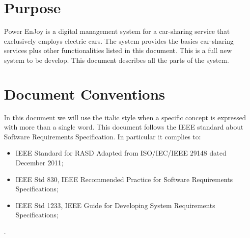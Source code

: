 \documentclass{scrreprt}
\begin{document}
\section{Purpose}
Power EnJoy is a digital management system for a car-sharing service that exclusively employs electric cars.
The system provides the basics car-sharing services plus other functionalities listed in this document.
This is a full new system to be develop. This document describes all the parts of the system. 
\begin{comment}$<$Identify the product whose software requirements are specified in this 
document, including the revision or release number. Describe the scope of the 
product that is covered by this SRS, particularly if this SRS describes only 
part of the system or a single subsystem.$>$
\end{comment}

\section{Document Conventions}
In this document we will use the italic style when a specific concept is expressed with more than a single word.
This document follows the IEEE standard about Software Requirements Specification. In particular it complies to:
\begin{itemize}
\item IEEE Standard for RASD Adapted from ISO/IEC/IEEE 29148 dated December 2011;
\item IEEE Std 830, IEEE Recommended Practice for Software Requirements Specifications;
\item IEEE Std 1233, IEEE Guide for Developing System Requirements Specifications;
\end{itemize}.
\begin{comment}$<$Describe any standards or typographical conventions that were followed when 
writing this SRS, such as fonts or highlighting that have special significance.  
For example, state whether priorities  for higher-level requirements are assumed 
to be inherited by detailed requirements, or whether every requirement statement 
is to have its own priority.$>$
\end{comment}
\end{document}
